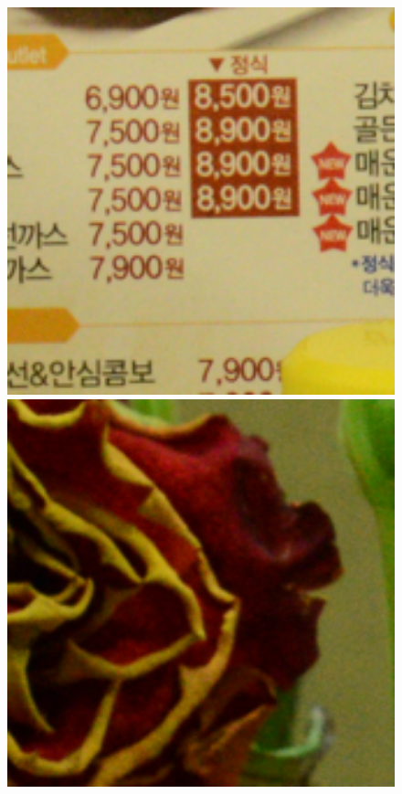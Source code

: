 \documentclass[10pt,twocolumn,letterpaper]{article}
\begin{document}
\begin{figure}[t]
{\begin{minipage}{0.055\textwidth}
\end{minipage}
\begin{minipage}{0.055\textwidth}
\includegraphics[width=1\textwidth]{images/resize_CC_Noisy_Nikon_D800_ISO_3200_A3_66.png}
\end{minipage}
\begin{minipage}{0.055\textwidth}
\includegraphics[width=1\textwidth]{images/resize_CC_Noisy_Nikon_D800_ISO_3200_A4_51.png}

\end{minipage}}
\end{figure}
\end{document}

